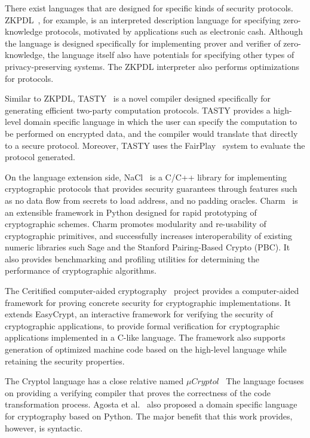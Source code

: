 \documentclass[a4paper, notitlepage]{report}
\begin{document}
There exist languages that are designed for specific kinds of security protocols.
ZKPDL~\cite{meiklejohn2010zkpdl}, for example, is an interpreted description language 
for specifying zero-knowledge protocols, motivated by applications such
as electronic cash. Although the language is designed specifically for
implementing prover and verifier of zero-knowledge, the language itself 
also have potentials for specifying other types of privacy-preserving 
systems. The ZKPDL interpreter also performs optimizations for protocols.

Similar to ZKPDL, TASTY~\cite{henecka2010tasty} is a novel compiler
designed specifically for generating efficient two-party computation
protocols. TASTY provides a high-level domain specific language in which
the user can specify the computation to be performed on encrypted data, 
and the compiler would translate that directly to a secure protocol.
Moreover, TASTY uses the FairPlay~\cite{malkhi2004fairplay} system to
evaluate the protocol generated.

On the language extension side,
NaCl~\cite{bernstein2012security} is a C/C++ library for implementing 
cryptographic protocols that 
provides security guarantees through features such as no data flow from 
secrets to load address, and no padding oracles.
Charm~\cite{akinyele2013charm}
is an extensible framework in Python 
designed for rapid prototyping of cryptographic schemes. Charm promotes
modularity and re-usability of cryptographic primitives, and successfully 
increases interoperability of existing numeric libraries such Sage and
the Stanford Pairing-Based Crypto (PBC). It also provides benchmarking
and profiling utilities for determining the performance of cryptographic
algorithms.

The Ceritified computer-aided cryptography~\cite{almeida2013certified} 
project provides a computer-aided framework for proving concrete security for
 cryptographic implementations. It extends EasyCrypt, an interactive framework
for verifying the security of cryptographic applications, to
provide formal verification for cryptographic applications implemented 
in a C-like language. The framework also supports generation of 
optimized machine code based on the high-level language while
retaining the security properties.

The Cryptol language has a close relative named
${\mu}Cryptol$~\cite{shields2006language,pike2006verifying}
The language focuses on providing a verifying compiler that proves the correctness
of the code transformation process.
Agosta et al.~\cite{agosta2007domain} also proposed a domain specific language
for cryptography based on Python. The major benefit that this work provides,
however, is syntactic.
\end{document}

